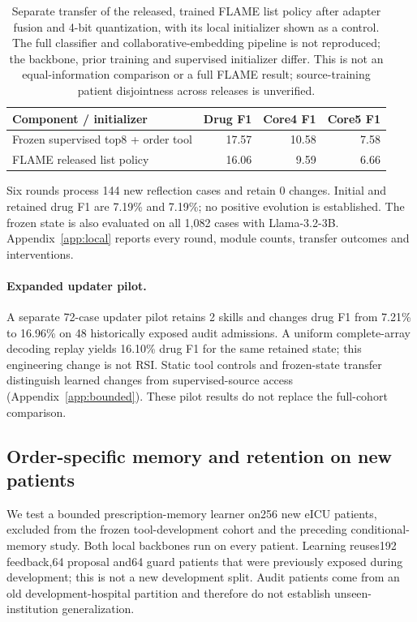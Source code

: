 \begin{table}[t]\centering\small
\setlength{\tabcolsep}{4pt}
\caption{Separate transfer of the released, trained FLAME list policy after adapter fusion and 4-bit quantization, with its local initializer shown as a control. The full classifier and collaborative-embedding pipeline is not reproduced; the backbone, prior training and supervised initializer differ. This is not an equal-information comparison or a full FLAME result; source-training patient disjointness across releases is unverified.}
\label{tab:flame-component}
\begin{tabular}{@{}lrrr@{}}\toprule
Component / initializer & Drug F1 & Core4 F1 & Core5 F1\\\midrule
Frozen supervised top8 + order tool & 17.57 & 10.58 & 7.58\\
FLAME released list policy \citep{flame} & 16.06 & 9.59 & 6.66\\
\bottomrule\end{tabular}
\end{table}
Six rounds process 144 new reflection cases and retain 0 changes. Initial and retained drug F1 are 7.19\% and 7.19\%; no positive evolution is established. The frozen state is also evaluated on all 1,082 cases with Llama-3.2-3B. Appendix~\ref{app:local} reports every round, module counts, transfer outcomes and interventions.
\paragraph{Expanded updater pilot.} A separate 72-case updater pilot retains 2 skills and changes drug F1 from 7.21\% to 16.96\% on 48 historically exposed audit admissions. A uniform complete-array decoding replay yields 16.10\% drug F1 for the same retained state; this engineering change is not RSI. Static tool controls and frozen-state transfer distinguish learned changes from supervised-source access (Appendix~\ref{app:bounded}). These pilot results do not replace the full-cohort comparison.







\subsection{Order-specific memory and retention on new patients}\label{sec:conditional-memory}
We test a bounded prescription-memory learner on256 new eICU patients, excluded from the frozen tool-development cohort and the preceding conditional-memory study. Both local backbones run on every patient. Learning reuses192 feedback,64 proposal and64 guard patients that were previously exposed during development; this is not a new development split. Audit patients come from an old development-hospital partition and therefore do not establish unseen-institution generalization.


